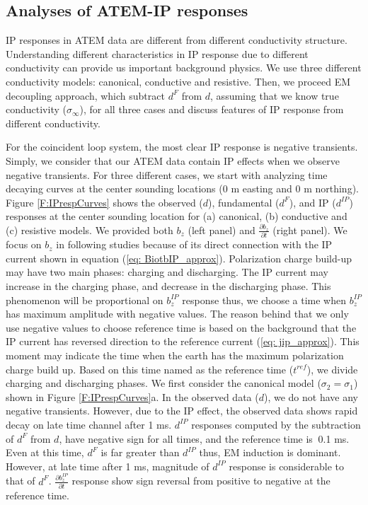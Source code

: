 \documentclass[a4paper, 11pt]{article}
\newcommand{\siginf}{\sigma_\infty}
\newcommand{\dip}{d^{IP}}
\begin{document}
\subsection{Analyses of ATEM-IP responses}
IP responses in ATEM data are different from different conductivity structure. Understanding different characteristics in IP response due to different conductivity can provide us important background physics. We use three different conductivity models: canonical, conductive and resistive. Then,  we proceed EM decoupling approach, which subtract $d^F$ from $d$,  assuming that we know true conductivity ($\siginf$), for all three cases and discuss features of IP response from different conductivity. 

For the coincident loop system, the most clear IP response is negative transients. Simply, we consider that our ATEM data contain IP effects when we observe negative transients. For three different cases, we start with analyzing time decaying curves at the center sounding locations (0 m easting and 0 m northing). Figure \ref{F:IPrespCurves} shows the observed ($d$), fundamental ($d^{F}$), and IP ($\dip$) responses at the center sounding location for (a) canonical, (b) conductive and (c) resistive models. We provided both $b_z$ (left panel) and $\frac{\partial b_z}{\partial t}$ (right panel). We focus on $b_z$ in following studies because of its direct connection with the IP current shown in equation (\ref{eq: BiotbIP_approx}). Polarization charge build-up may have two main phases: charging and discharging. The IP current may increase in the charging phase, and decrease in the discharging phase. This phenomenon will be proportional on $b^{IP}_z$ response thus, we choose a time when $b^{IP}_z$ has maximum amplitude with negative values. The reason behind that we only use negative values to choose reference time is based on the background that the IP current has reversed direction to the reference current (\ref{eq: jip_approx}). This moment may indicate the time when the earth has the maximum polarization charge build up. Based on this time named as the reference time ($t^{ref}$), we divide charging and discharging phases.  We first consider the canonical model ($\sigma_2 = \sigma_1$) shown in Figure \ref{F:IPrespCurves}a. In the observed data ($d$), we do not have any negative transients. However, due to the IP effect, the observed data shows rapid decay on late time channel after 1 ms. $\dip$ responses computed by the subtraction of $d^F$ from $d$, have negative sign for all times, and the reference time is $~$0.1 ms. Even at this time, $d^{F}$ is far greater than $\dip$ thus, EM induction is dominant. However, at late time after 1 ms, magnitude of $\dip$ response is considerable to that of $d^{F}$. $\frac{\partial b^{IP}_z}{\partial t}$ response show sign reversal from positive to negative at the reference time.
\end{document}
